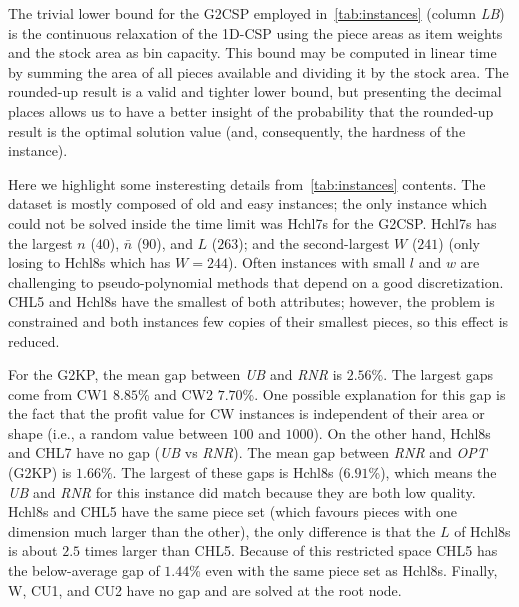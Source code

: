 \documentclass[9pt]{entcs}
\begin{document}
The trivial lower bound for the G2CSP employed in~\cref{tab:instances} (column \emph{LB}) is the continuous relaxation of the 1D-CSP using the piece areas as item weights and the stock area as bin capacity.
This bound may be computed in linear time by summing the area of all pieces available and dividing it by the stock area.
The rounded-up result is a valid and tighter lower bound, but presenting the decimal places allows us to have a better insight of the probability that the rounded-up result is the optimal solution value (and, consequently, the hardness of the instance).

Here we highlight some insteresting details from~\cref{tab:instances} contents.
The dataset is mostly composed of old and easy instances; the only instance which could not be solved inside the time limit was Hchl7s for the G2CSP.
Hchl7s has the largest \(n\) (\(40\)), \(\bar{n}\) (\(90\)), and \(L\) (\(263\)); and the second-largest \(W\) (\(241\)) (only losing to Hchl8s which has \(W = 244\)).
Often instances with small \underline{\(l\)} and \underline{\(w\)} are challenging to pseudo-polynomial methods that depend on a good discretization.
CHL5 and Hchl8s have the smallest of both attributes; however, the problem is constrained and both instances few copies of their smallest pieces, so this effect is reduced.

For the G2KP, the mean gap between \emph{UB} and \emph{RNR} is \(2.56\)\%. The largest gaps come from CW1 \(8.85\)\% and CW2 \(7.70\)\%.
One possible explanation for this gap is the fact that the profit value for CW instances is independent of their area or shape (i.e., a random value between \(100\) and \(1000\)).
On the other hand, Hchl8s and CHL7 have no gap (\emph{UB} vs \emph{RNR}).
The mean gap between \emph{RNR} and \emph{OPT} (G2KP) is \(1.66\)\%.
The largest of these gaps is Hchl8s (\(6.91\)\%), which means the \emph{UB} and \emph{RNR} for this instance did match because they are both low quality.
Hchl8s and CHL5 have the same piece set (which favours pieces with one dimension much larger than the other), the only difference is that the \(L\) of Hchl8s is about \(2.5\) times larger than CHL5.
Because of this restricted space CHL5 has the below-average gap of \(1.44\)\% even with the same piece set as Hchl8s.
Finally, W, CU1, and CU2 have no gap and are solved at the root node.
\end{document}
